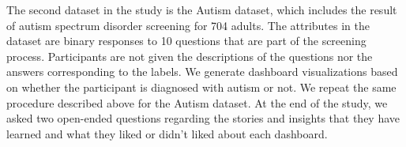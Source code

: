 \par The second dataset in the study is the Autism dataset\cite{autism}, which includes the result of autism spectrum disorder screening for 704 adults. The attributes in the dataset are  binary responses to 10 questions that are part of the screening process. Participants are not given the descriptions of the questions nor the answers corresponding to the labels. We generate dashboard visualizations based on whether the participant is diagnosed with autism or not. We repeat the same procedure described above for the Autism dataset. At the end of the study, we asked two open-ended questions regarding the stories and insights that they have learned and what they liked or didn't liked about each dashboard.
